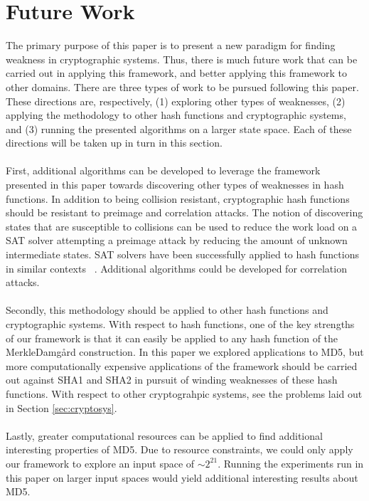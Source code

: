 \documentclass[letterpaper,twocolumn,10pt]{article}
\begin{document}
\section{Future Work}

The primary purpose of this paper is to present a new paradigm for finding weakness in cryptographic systems. Thus, there is much future work that can be carried out in applying this framework, and better applying this framework to other domains. There are three types of work to be pursued following this paper. These directions are, respectively, (1) exploring other types of weaknesses, (2) applying the methodology to other hash functions and cryptographic systems, and (3) running the presented algorithms on a larger state space. Each of these directions will be taken up in turn in this section. 
\\
\\
First, additional algorithms can be developed to leverage the framework presented in this paper towards discovering other types of weaknesses in hash functions. In addition to being collision resistant, cryptographic hash functions should be resistant to preimage and correlation attacks. The notion of discovering states that are susceptible to collisions can be used to reduce the work load on a SAT solver attempting a preimage attack by reducing the amount of unknown intermediate states. SAT solvers have been successfully applied to hash functions in similar contexts ~\cite{mironov2006applications}. Additional algorithms could be developed for correlation attacks. 
\\
\\
Secondly, this methodology should be applied to other hash functions and cryptographic systems. With respect to hash functions, one of the key strengths of our framework is that it can easily be applied to any hash function of the Merkle{\textendash}Damg\r{a}rd construction. In this paper we explored applications to MD5, but more computationally expensive applications of the framework should be carried out against SHA1 and SHA2 in pursuit of winding weaknesses of these hash functions. With respect to other cryptograhpic systems, see the problems laid out in Section \ref{sec:cryptosys}.
\\
\\
Lastly, greater computational resources can be applied to find additional interesting properties of MD5. Due to resource constraints, we could only apply our framework to explore an input space of  $\sim 2^{21}$. Running the experiments run in this paper on larger input spaces would yield additional interesting results about MD5. 
\end{document}
